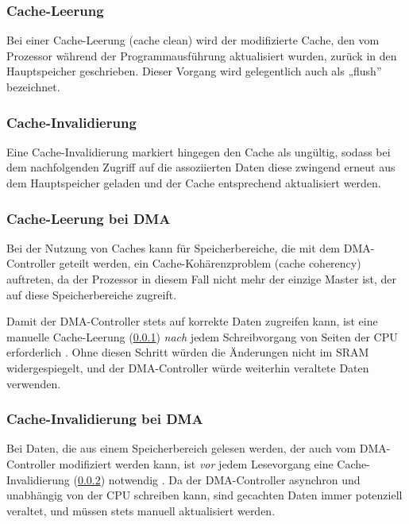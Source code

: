 \subsubsection{Cache-Leerung} \label{sec:cache_clean}

Bei einer Cache-Leerung (cache clean) wird der modifizierte Cache, den vom
Prozessor während der Programmausführung aktualisiert wurden, zurück in den
Hauptspeicher geschrieben. Dieser Vorgang wird gelegentlich auch als „flush”
bezeichnet.

\subsubsection{Cache-Invalidierung} \label{sec:cache_invalidate}

Eine Cache-Invalidierung markiert hingegen den Cache als ungültig, sodass bei
dem nachfolgenden Zugriff auf die assoziierten Daten diese zwingend erneut aus
dem Hauptspeicher geladen und der Cache entsprechend aktualisiert werden.

\subsubsection{Cache-Leerung bei DMA} \label{sec:cache_clean_dma}

Bei der Nutzung von Caches kann für Speicherbereiche, die mit dem DMA-Controller
geteilt werden, ein Cache-Kohärenzproblem (cache coherency) auftreten, da der
Prozessor in diesem Fall nicht mehr der einzige Master ist, der auf diese
Speicherbereiche zugreift.

Damit der DMA-Controller stets auf korrekte Daten zugreifen kann, ist eine
manuelle Cache-Leerung (\ref{sec:cache_clean}) \textit{nach} jedem
Schreibvorgang von Seiten der CPU erforderlich \cite[S. 6]{an4839}. Ohne diesen
Schritt würden die Änderungen nicht im SRAM widergespiegelt, und der
DMA-Controller würde weiterhin veraltete Daten verwenden.

\subsubsection{Cache-Invalidierung bei DMA}

Bei Daten, die aus einem Speicherbereich gelesen werden, der auch vom
DMA-Controller modifiziert werden kann, ist \textit{vor} jedem Lesevorgang eine
Cache-Invalidierung (\ref{sec:cache_invalidate}) notwendig
\cite{embeddedexpert_cache}. Da der DMA-Controller asynchron und unabhängig von
der CPU schreiben kann, sind gecachten Daten immer potenziell veraltet, und
müssen stets manuell aktualisiert werden.

